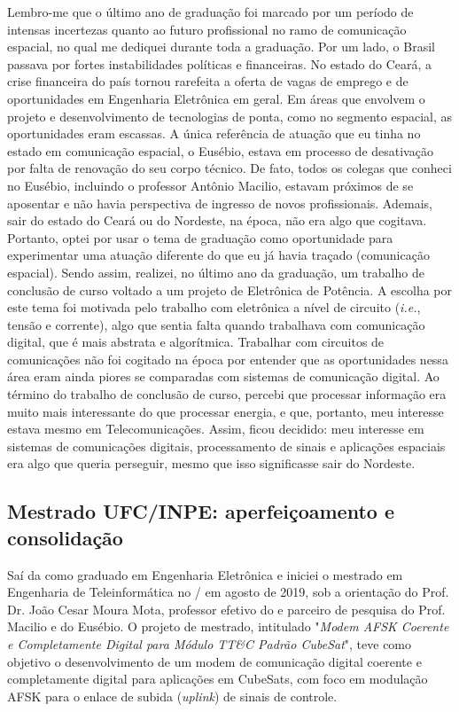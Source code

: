 \documentclass{article}
\begin{document}
Lembro-me que o último ano de graduação foi marcado por um período de intensas incertezas quanto ao futuro profissional no ramo de comunicação espacial, no qual me dediquei durante toda a graduação. Por um lado, o Brasil passava por fortes instabilidades políticas e financeiras. No estado do Ceará, a crise financeira do país tornou rarefeita a oferta de vagas de emprego e de oportunidades em Engenharia Eletrônica em geral. Em áreas que envolvem o projeto e desenvolvimento de tecnologias de ponta, como no segmento espacial, as oportunidades eram escassas. A única referência de atuação que eu tinha no estado em comunicação espacial, o  Eusébio, estava em processo de desativação por falta de renovação do seu corpo técnico. De fato, todos os colegas que conheci no  Eusébio, incluindo o professor Antônio Macilio, estavam próximos de se aposentar e não havia perspectiva de ingresso de novos profissionais. Ademais, sair do estado do Ceará ou do Nordeste, na época, não era algo que cogitava. Portanto, optei por usar o tema de graduação como oportunidade para experimentar uma atuação diferente do que eu já havia traçado (comunicação espacial). Sendo assim, realizei, no último ano da graduação, um trabalho de conclusão de curso voltado a um projeto de Eletrônica de Potência. A escolha por este tema foi motivada pelo trabalho com eletrônica a nível de circuito (\textit{i.e.}, tensão e corrente), algo que sentia falta quando trabalhava com comunicação digital, que é mais abstrata e algorítmica. Trabalhar com circuitos de comunicações não foi cogitado na época por entender que as oportunidades nessa área eram ainda piores se comparadas com sistemas de comunicação digital. Ao término do trabalho de conclusão de curso, percebi que processar informação era muito mais interessante do que processar energia, e que, portanto, meu interesse estava mesmo em Telecomunicações. Assim, ficou decidido: meu interesse em sistemas de comunicações digitais, processamento de sinais e aplicações espaciais era algo que queria perseguir, mesmo que isso significasse sair do Nordeste.

\subsection{Mestrado UFC/INPE: aperfeiçoamento e consolidação}

Saí da  como graduado em Engenharia Eletrônica e iniciei o mestrado em Engenharia de Teleinformática no / em agosto de 2019, sob a orientação do Prof. Dr. João Cesar Moura Mota, professor efetivo do  e parceiro de pesquisa do Prof. Macilio e do  Eusébio. O projeto de mestrado, intitulado "\emph{Modem AFSK Coerente e Completamente Digital para Módulo TT\&C Padrão CubeSat}", teve como objetivo o desenvolvimento de um modem de comunicação digital coerente e completamente digital para aplicações em CubeSats, com foco em modulação AFSK para o enlace de subida (\textit{uplink}) de sinais de controle.
\end{document}
